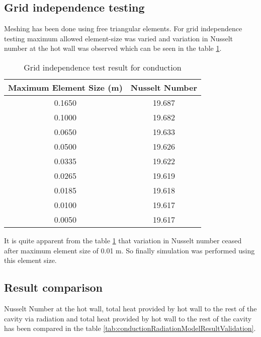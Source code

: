 \subsection{Grid independence testing}
Meshing has been done using free triangular elements. For grid independence testing	maximum allowed element-size was varied and variation in Nusselt number at the hot wall was observed which can be seen in the table \ref{gridTestCond}. 


\begin{table}[H]
\centering
\caption{Grid independence test result for conduction}
\label{gridTestCond}
\begin{tabular}{@{}|c|c|@{}}
\toprule
\textbf{Maximum Element Size (m)} & \textbf{Nusselt Number} \\ \midrule
0.1650                            & 19.687                  \\ \midrule
0.1000                            & 19.682                  \\ \midrule
0.0650                            & 19.633                  \\ \midrule
0.0500                            & 19.626                  \\ \midrule
0.0335                            & 19.622                  \\ \midrule
0.0265                            & 19.619                  \\ \midrule
0.0185                            & 19.618                  \\ \midrule
0.0100                            & 19.617                  \\ \midrule
0.0050                            & 19.617                  \\ \bottomrule
\end{tabular}
\end{table}

It is quite apparent from the table \ref{gridTestCond} that variation in Nusselt number ceased after maximum element size of 0.01 m. So finally simulation was performed using this element size.

\subsection{Result comparison}
Nusselt Number at the hot wall, total heat provided by hot wall to the rest of the cavity via radiation and total heat provided by hot wall to the rest of the cavity has been compared in the table \ref{tab:conductionRadiationModelResultValidation}.

